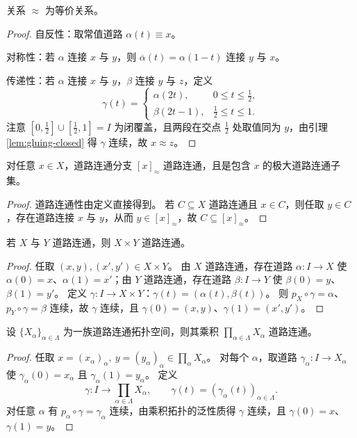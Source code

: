 \documentclass[lang=cn,a4paper,newtx,figureplace=section,tableplace=section]{elegantbook}
\begin{document}
\begin{proposition}\label{prop:path-component-eqrel}
  关系 $\approx$ 为等价关系。
\end{proposition}
\begin{proof}
  自反性：取常值道路 $\alpha(t)\equiv x$。

  对称性：若 $\alpha$ 连接 $x$ 与 $y$，则 $\overline\alpha(t)=\alpha(1-t)$ 连接 $y$ 与 $x$。

  传递性：若 $\alpha$ 连接 $x$ 与 $y$，$\beta$ 连接 $y$ 与 $z$，定义
  \[
    \gamma(t)=\begin{cases}
      \alpha(2t), & 0\le t\le\tfrac12,\\
      \beta(2t-1), & \tfrac12\le t\le 1.
    \end{cases}
  \]
  注意 $[0,\tfrac12]\cup[\tfrac12,1]=I$ 为闭覆盖，且两段在交点 $\tfrac12$ 处取值同为 $y$，由引理 \ref{lem:gluing-closed} 得 $\gamma$ 连续，故 $x\approx z$。
\end{proof}

\begin{proposition}\label{prop:path-components-maximal}
  对任意 $x\in X$，道路连通分支 $[x]_{\approx}$ 道路连通，且是包含 $x$ 的极大道路连通子集。
\end{proposition}
\begin{proof}
  道路连通性由定义直接得到。
  若 $C\subseteq X$ 道路连通且 $x\in C$，则任取 $y\in C$，存在道路连接 $x$ 与 $y$，从而 $y\in[x]_{\approx}$，故 $C\subseteq[x]_{\approx}$。
\end{proof}


\begin{proposition}\label{prop:product-path-connected-2}
  若 $X$ 与 $Y$ 道路连通，则 $X\times Y$ 道路连通。
\end{proposition}
\begin{proof}
  任取 $(x,y),(x',y')\in X\times Y$。
  由 $X$ 道路连通，存在道路 $\alpha:I\to X$ 使 $\alpha(0)=x$、$\alpha(1)=x'$；由 $Y$ 道路连通，存在道路 $\beta:I\to Y$ 使 $\beta(0)=y$、$\beta(1)=y'$。
  定义 $\gamma:I\to X\times Y$：$\gamma(t)=(\alpha(t),\beta(t))$。
  则 $p_X\circ\gamma=\alpha$、$p_Y\circ\gamma=\beta$ 连续，故 $\gamma$ 连续，且 $\gamma(0)=(x,y)$、$\gamma(1)=(x',y')$。
\end{proof}

\begin{proposition}\label{prop:product-path-connected}
  设 $\{X_\alpha\}_{\alpha\in\Lambda}$ 为一族道路连通拓扑空间，则其乘积 $\prod_{\alpha\in\Lambda}X_\alpha$ 道路连通。
\end{proposition}
\begin{proof}
  任取 $x=(x_\alpha)_\alpha,\ y=(y_\alpha)_\alpha\in\prod_\alpha X_\alpha$。
  对每个 $\alpha$，取道路 $\gamma_\alpha:I\to X_\alpha$ 使 $\gamma_\alpha(0)=x_\alpha$ 且 $\gamma_\alpha(1)=y_\alpha$。
  定义
  \[
    \gamma:I\to\prod_{\alpha\in\Lambda}X_\alpha,\qquad \gamma(t)=(\gamma_\alpha(t))_{\alpha\in\Lambda}.
  \]
  对任意 $\alpha$ 有 $p_\alpha\circ\gamma=\gamma_\alpha$ 连续，由乘积拓扑的泛性质得 $\gamma$ 连续，且 $\gamma(0)=x$、$\gamma(1)=y$。
\end{proof}
\end{document}

